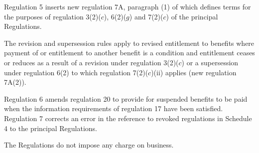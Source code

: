 \documentclass[12pt,a4paper]{article}
\begin{document}
Regulation 5 inserts new regulation 7A, paragraph (1) of which defines terms for the purposes of regulation 3(2)($c$), 6(2)($g$) and 7(2)($c$) of the principal Regulations.

The revision and supersession rules apply to revised entitlement to benefits where payment of or entitlement to another benefit is a condition and entitlement ceases or reduces as a result of a revision under regulation 3(2)($c$) or a supersession under regulation 6(2) to which regulation 7(2)($c$)(ii) applies (new regulation 7A(2)).

Regulation 6 amends regulation 20 to provide for suspended benefits to be paid when the information requirements of regulation 17 have been satisfied. Regulation 7 corrects an error in the reference to revoked regulations in Schedule 4 to the principal Regulations.

The Regulations do not impose any charge on business. 
\end{document}
